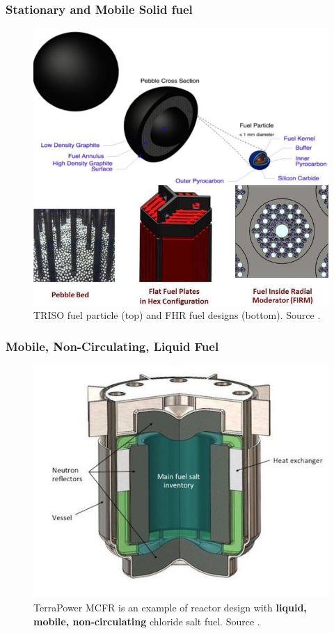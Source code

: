 \begin{frame}
  \frametitle{Stationary and Mobile Solid fuel}
               \begin{figure}[t]
                \vspace*{-0.1in}
			\hspace*{-0.35in}
                \includegraphics[height=0.65\textwidth]{./images/solid_fuel.jpg}
                \caption{TRISO fuel particle (top) and FHR fuel designs (bottom). Source \cite{forsberg_basis_2016-1}.}
             \end{figure}   
  
\end{frame}

\begin{frame}
  \frametitle{Mobile, Non-Circulating, Liquid Fuel}
               \begin{figure}[t]
                \vspace*{-0.1in}
			\hspace*{-0.35in}
                \includegraphics[height=0.6\textwidth]{./images/mcfr-crossection.jpg}
                \caption{TerraPower MCFR is an example of reactor design with \textbf{liquid, mobile, non-circulating} chloride salt fuel. Source \cite{doene_southern_2018}.}
             \end{figure}   
  
\end{frame}

